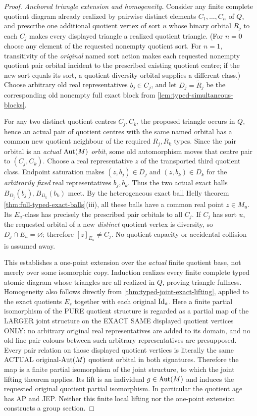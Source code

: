 \begin{proof}
\emph{Anchored triangle extension and homogeneity.}
Consider any finite complete quotient diagram already realized
by pairwise distinct elements $C_1,\ldots,C_n$ of $Q$, and
prescribe one additional quotient vertex of sort $u$ whose
binary orbital $R_j$ to each $C_j$ makes every displayed
triangle a realized quotient triangle.  (For $n=0$ choose any element of the
requested nonempty quotient sort. For $n=1$,
transitivity of the \emph{original} named
sort action makes each requested nonempty
quotient pair orbital incident to the
prescribed existing quotient centre; if
the new sort equals its sort, a quotient
diversity orbital supplies a different class.)  Choose arbitrary old real
representatives $b_j\in C_j$, and let $D_j=\widetilde R_j$
be the corresponding old nonempty full exact block from
\cref{lem:typed-simultaneous-blocks}.

For any two distinct quotient centres $C_j,C_k$, the proposed
triangle occurs in $Q$, hence an actual pair of quotient
centres with the same named orbital has a common new quotient
neighbour of the required $R_j,R_k$ types.  Since the pair
orbital is an \emph{actual $\operatorname{Aut}(M)$ orbit}, some old
automorphism moves that centre pair to $(C_j,C_k)$.  Choose a
real representative $z$ of the transported third quotient
class.  Endpoint saturation makes $(z,b_j)\in D_j$ and
$(z,b_k)\in D_k$ for the \emph{arbitrarily fixed} real
representatives $b_j,b_k$.  Thus the two actual exact balls
$B_{D_j}(b_j),B_{D_k}(b_k)$ meet.  By the heterogeneous exact
ball Helly theorem \cref{thm:full-typed-exact-balls}(iii),
all these balls have a common real point $z\in M_u$.
Its $E_u$-class has precisely the prescribed pair orbitals to
all $C_j$.  If $C_j$ has sort $u$, the requested orbital of a
new \emph{distinct} quotient vertex is diversity, so
$D_j\cap E_u=\varnothing$; therefore $[z]_{E_u}\ne C_j$.
No quotient capacity or accidental collision is assumed away.

This establishes a one-point extension over the \emph{actual}
finite quotient base, not merely over some isomorphic copy.
Induction realizes every finite complete typed atomic diagram
whose triangles are all realized in $Q$, proving triangle
fullness.  Homogeneity also follows directly from
\cref{thm:typed-joint-exact-lifting}, applied to the exact
quotients $E_s$ together with each original $\mathrm{Id}_s$.
Here a finite partial isomorphism of the PURE
quotient structure is regarded as a partial
map of the LARGER joint structure on the
EXACT SAME displayed quotient vertices
ONLY: no arbitrary original real
representatives are added to its domain,
and no old fine pair colours between
such arbitrary representatives are
presupposed. Every pair relation on those
displayed quotient vertices is literally
the same ACTUAL original-$\operatorname{Aut}(M)$ quotient
orbital in both signatures. Therefore
the map is a finite partial isomorphism
of the joint structure, to which the
joint lifting theorem applies. Its lift
is an individual $g\in\operatorname{Aut}(M)$ and
induces the requested original quotient
partial isomorphism. In particular the
quotient age has AP and JEP.  Neither this finite local
lifting nor the one-point extension constructs a group section.


\end{proof}
